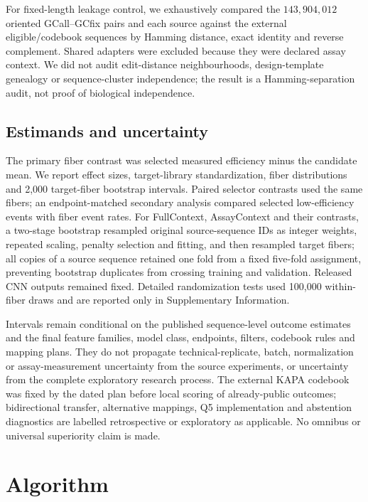 \documentclass[10pt]{article}
\begin{document}
For fixed-length leakage control, we exhaustively compared the $143{,}904{,}012$ oriented GCall--GCfix pairs and each source against the external eligible/codebook sequences by Hamming distance, exact identity and reverse complement. Shared adapters were excluded because they were declared assay context. We did not audit edit-distance neighbourhoods, design-template genealogy or sequence-cluster independence; the result is a Hamming-separation audit, not proof of biological independence.

\subsection{Estimands and uncertainty}

The primary fiber contrast was selected measured efficiency minus the candidate mean. We report effect sizes, target-library standardization, fiber distributions and 2,000 target-fiber bootstrap intervals. Paired selector contrasts used the same fibers; an endpoint-matched secondary analysis compared selected low-efficiency events with fiber event rates. For FullContext, AssayContext and their contrasts, a two-stage bootstrap resampled original source-sequence IDs as integer weights, repeated scaling, penalty selection and fitting, and then resampled target fibers; all copies of a source sequence retained one fold from a fixed five-fold assignment, preventing bootstrap duplicates from crossing training and validation. Released CNN outputs remained fixed. Detailed randomization tests used 100,000 within-fiber draws and are reported only in Supplementary Information.

Intervals remain conditional on the published sequence-level outcome estimates and the final feature families, model class, endpoints, filters, codebook rules and mapping plans. They do not propagate technical-replicate, batch, normalization or assay-measurement uncertainty from the source experiments, or uncertainty from the complete exploratory research process. The external KAPA codebook was fixed by the dated plan before local scoring of already-public outcomes; bidirectional transfer, alternative mappings, Q5 implementation and abstention diagnostics are labelled retrospective or exploratory as applicable. No omnibus or universal superiority claim is made.

\section{Algorithm}
\end{document}
